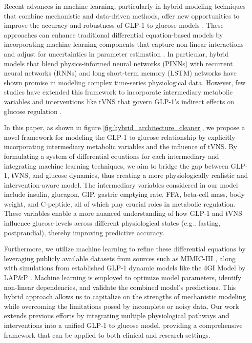 \documentclass[9pt,shortpaper,twoside,web]{ieeecolor}
\begin{document}
 

Recent advances in machine learning, particularly in hybrid modeling techniques that combine mechanistic and data-driven methods, offer new opportunities to improve the accuracy and robustness of GLP-1 to glucose models \cite{wang2024glp1, reimann2024stimulating}. These approaches can enhance traditional differential equation-based models by incorporating machine learning components that capture non-linear interactions and adjust for uncertainties in parameter estimation \cite{shaohormone2024, asteria2024disruptors}. In particular, hybrid models that blend physics-informed neural networks (PINNs) \cite{aghapinn2024, minadakis2024pinns} with recurrent neural networks (RNNs) \cite{chung2014rnn, mikolov2010rnn} and long short-term memory (LSTM) networks \cite{hochreiter1997lstm, gers2000lstm} have shown promise in modeling complex time-series physiological data. However, few studies have extended this framework to incorporate intermediary metabolic variables and interventions like tVNS that govern GLP-1's indirect effects on glucose regulation \cite{mingrone2024obesity, shaohormone2024}.

In this paper, as shown in figure \ref{fig:hybrid_architecture_cleaner}, we propose a novel framework for modeling the GLP-1 to glucose relationship by explicitly incorporating intermediary metabolic variables and the influence of tVNS. By formulating a system of differential equations for each intermediary and integrating machine learning techniques, we aim to bridge the gap between GLP-1, tVNS, and glucose dynamics, thus creating a more physiologically realistic and intervention-aware model. The intermediary variables considered in our model include insulin, glucagon, GIP, gastric emptying rate, FFA, beta-cell mass, body weight, and C-peptide, all of which play crucial roles in metabolic regulation. These variables enable a more nuanced understanding of how GLP-1 and tVNS influence glucose levels across different physiological states (e.g., fasting, postprandial), thereby improving predictive accuracy.


Furthermore, we utilize machine learning to refine these differential equations by leveraging publicly available datasets from sources such as MIMIC-III \cite{johnson2016mimic}, along with simulations from established GLP-1 dynamic models like the 4GI Model by LAP\&P \cite{camps2020lap}. Machine learning is employed to optimize model parameters, identify non-linear dependencies, and validate the combined model's predictions. This hybrid approach allows us to capitalize on the strengths of mechanistic modeling while overcoming the limitations posed by incomplete or noisy data. Our work extends previous efforts by integrating multiple physiological pathways and interventions into a unified GLP-1 to glucose model, providing a comprehensive framework that can be applied to both clinical and research settings.
\end{document}
